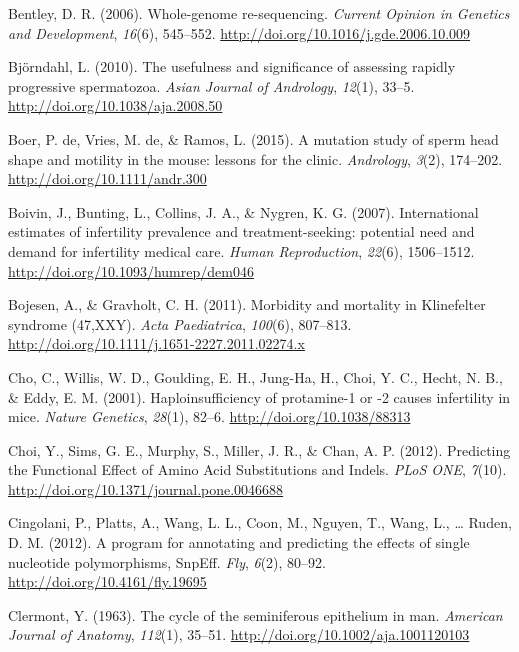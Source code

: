 \documentclass[12pt,twoside]{reedthesis}
\theoremstyle{definition}
\theoremstyle{definition}
\theoremstyle{remark}
\begin{document}
  \hypertarget{ref-Bentley2006}{}
  Bentley, D. R. (2006). Whole-genome re-sequencing. \emph{Current Opinion
  in Genetics and Development}, \emph{16}(6), 545--552.
  \url{http://doi.org/10.1016/j.gde.2006.10.009}
  
  \hypertarget{ref-Bjorndahl2010}{}
  Björndahl, L. (2010). The usefulness and significance of assessing
  rapidly progressive spermatozoa. \emph{Asian Journal of Andrology},
  \emph{12}(1), 33--5. \url{http://doi.org/10.1038/aja.2008.50}
  
  \hypertarget{ref-DeBoer2015}{}
  Boer, P. de, Vries, M. de, \& Ramos, L. (2015). A mutation study of
  sperm head shape and motility in the mouse: lessons for the clinic.
  \emph{Andrology}, \emph{3}(2), 174--202.
  \url{http://doi.org/10.1111/andr.300}
  
  \hypertarget{ref-Boivin2007a}{}
  Boivin, J., Bunting, L., Collins, J. A., \& Nygren, K. G. (2007).
  International estimates of infertility prevalence and treatment-seeking:
  potential need and demand for infertility medical care. \emph{Human
  Reproduction}, \emph{22}(6), 1506--1512.
  \url{http://doi.org/10.1093/humrep/dem046}
  
  \hypertarget{ref-Bojesen2011}{}
  Bojesen, A., \& Gravholt, C. H. (2011). Morbidity and mortality in
  Klinefelter syndrome (47,XXY). \emph{Acta Paediatrica}, \emph{100}(6),
  807--813. \url{http://doi.org/10.1111/j.1651-2227.2011.02274.x}
  
  \hypertarget{ref-Cho2001}{}
  Cho, C., Willis, W. D., Goulding, E. H., Jung-Ha, H., Choi, Y. C.,
  Hecht, N. B., \& Eddy, E. M. (2001). Haploinsufficiency of protamine-1
  or -2 causes infertility in mice. \emph{Nature Genetics}, \emph{28}(1),
  82--6. \url{http://doi.org/10.1038/88313}
  
  \hypertarget{ref-Choi2012}{}
  Choi, Y., Sims, G. E., Murphy, S., Miller, J. R., \& Chan, A. P. (2012).
  Predicting the Functional Effect of Amino Acid Substitutions and Indels.
  \emph{PLoS ONE}, \emph{7}(10).
  \url{http://doi.org/10.1371/journal.pone.0046688}
  
  \hypertarget{ref-Cingolani2012}{}
  Cingolani, P., Platts, A., Wang, L. L., Coon, M., Nguyen, T., Wang, L.,
  \ldots{} Ruden, D. M. (2012). A program for annotating and predicting
  the effects of single nucleotide polymorphisms, SnpEff. \emph{Fly},
  \emph{6}(2), 80--92. \url{http://doi.org/10.4161/fly.19695}
  
  \hypertarget{ref-Clermont1963}{}
  Clermont, Y. (1963). The cycle of the seminiferous epithelium in man.
  \emph{American Journal of Anatomy}, \emph{112}(1), 35--51.
  \url{http://doi.org/10.1002/aja.1001120103}
  
\end{document}
